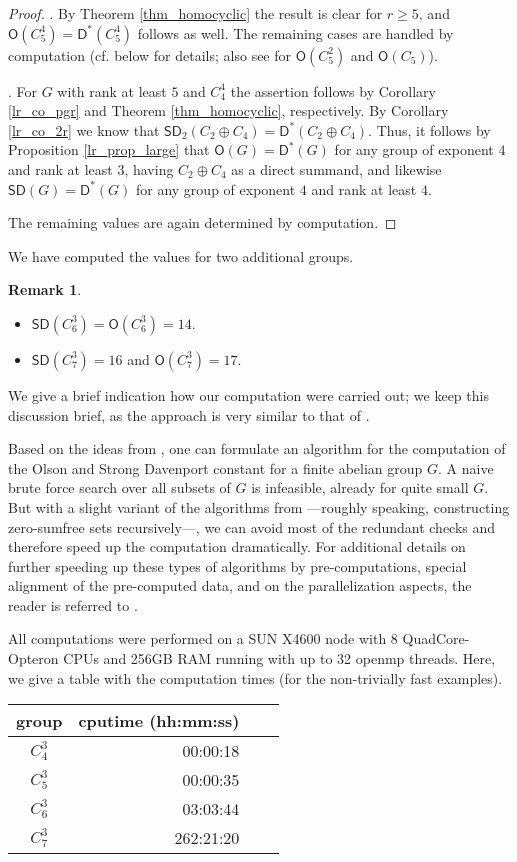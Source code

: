 \documentclass{amsart}
\theoremstyle{definition}
\newtheorem{rem}[thm]{Remark}
\numberwithin{equation}{section}
\begin{document}
\begin{proof}
. By Theorem \ref{thm_homocyclic} the result is clear for
$r\ge 5$, and ${\mathsf{O}}(C_5^4)={\mathsf{D}^{\ast}}(C_5^4)$ follows as well.
The remaining cases are handled by computation
(cf. below for details; also see \cite{sub} for ${\mathsf{O}}(C_5^2)$ and ${\mathsf{O}}(C_5)$).

. For $G$ with rank at least $5$ and $C_4^4$ the assertion follows by
Corollary \ref{lr_co_pgr} and Theorem \ref{thm_homocyclic}, respectively.
By Corollary \ref{lr_co_2r} we know that ${\mathsf{SD}}_2(C_2\oplus C_4)={\mathsf{D}^{\ast}}(C_2\oplus C_4)$.
Thus, it follows by Proposition \ref{lr_prop_large} that ${\mathsf{O}}(G)={\mathsf{D}^{\ast}}(G)$ for any group of exponent $4$ and rank at least $3$,
having $C_2 \oplus C_4$ as a direct summand, and likewise
${\mathsf{SD}}(G)={\mathsf{D}^{\ast}}(G)$ for any group of exponent $4$ and rank at least $4$.

The remaining values are again determined by computation.
\end{proof}

We have computed the values for two additional groups.
\begin{rem} \
\begin{itemize}
\item ${\mathsf{SD}}(C_6^3)={\mathsf{O}}(C_6^3)= 14$.
\item ${\mathsf{SD}}(C_7^3)=16$ and ${\mathsf{O}}(C_7^3)=17$.
\end{itemize}
\end{rem}

We give a brief indication how our computation were carried out; we keep this discussion brief, as the approach is very similar to that of \cite{lzs}.

Based on the ideas from \cite{lzs}, one can formulate an algorithm for the computation of the Olson and Strong Davenport constant for a finite abelian group $G$. A naive brute force search over all subsets of $G$ is infeasible, already for quite small $G$. But with a slight variant of the algorithms from \cite{lzs}---roughly speaking, constructing zero-sumfree sets recursively---, we can avoid most of the redundant checks and therefore speed up the computation dramatically. For additional details on further speeding up these types of algorithms by pre-computations, special alignment of the pre-computed data, and on the parallelization aspects, the reader is referred to \cite[Section 3]{lzs}.

All computations were performed on a SUN X4600 node with 8 QuadCore-Opteron CPUs and 256GB RAM running with up to 32 openmp threads. Here, we give a table with the computation times (for the non-trivially fast examples).
\begin{center}
\begin{tabular}{crrc}
\bfseries group & cputime (hh:mm:ss) \\
\hline
$C_4^3$ & 00:00:18 \\
$C_5^3$ & 00:00:35 \\
$C_6^3$ & 03:03:44 \\
$C_7^3$ & 262:21:20
\end{tabular}
\end{center}
\end{document}
